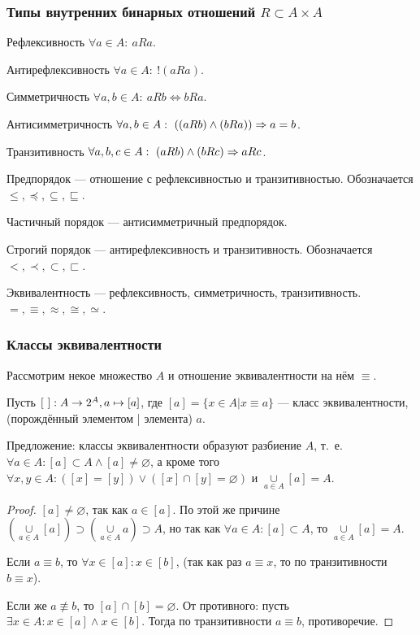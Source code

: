 \documentclass[a4paper]{report}
\begin{document}
    \subsubsection{Типы внутренних бинарных отношений $R \subset A \times A$}

    Рефлексивность $\forall a \in A:~a R a$.

    Антирефлексивность $\forall a \in A:~!(a R a)$.

    Симметричность $\forall a, b \in A:~a R b \iff b R a$.

    Антисимметричность $\forall a, b \in A:~((a R b) \land (b R a)) \Rightarrow a = b$.

    Транзитивность $\forall a, b, c \in A:~(a R b) \land (b R c) \Rightarrow a R c$.

    Предпорядок --- отношение с рефлексивностью и транзитивностью.
    Обозначается $\le, \preceq, \subseteq, \sqsubseteq$.

    Частичный порядок --- антисимметричный предпорядок.

    Строгий порядок --- антирефлексивность и транзитивность.
    Обозначается $<, \prec, \subset, \sqsubset$.

    Эквивалентность --- рефлексивность, симметричность, транзитивность. $=, \equiv, \approx, \cong, \simeq$.

    \subsubsection{Классы эквивалентности}

    Рассмотрим некое множество $A$ и отношение эквивалентности на нём $\equiv$.

    Пусть $[~]: A \rightarrow 2^A, a \mapsto [a]$, где $[a] = \{x \in A | x \equiv a\}$ --- класс эквивалентности, (порождённый элементом | элемента) $a$.

    Предложение: классы эквивалентности образуют разбиение $A$, т.\ е.\ $\forall a \in A: [a] \subset A \land [a] \ne \varnothing$, а кроме того $\forall x, y \in A: ([x] = [y]) \lor ([x] \cap [y] = \varnothing)$ и $\underset{a \in A}{\cup}[a] = A$.

    \begin{proof}
        $[a] \ne \varnothing$, так как $a \in [a]$.
        По этой же причине $\left(\underset{a \in A}{\cup}[a]\right) \supset \left(\underset{a \in A}{\cup}a\right) \supset A$, но так как $\forall a \in A: [a] \subset A$, то  $\underset{a \in A}{\cup}[a] = A$.

        Если $a \equiv b$, то $\forall x \in [a] : x \in [b]$, (так как раз $a \equiv x$, то по транзитивности $b \equiv x$).

        Если же $a \not\equiv b$, то $[a] \cap [b] = \varnothing$.
        От противного: пусть $\exists x \in A: x \in [a] \land x \in [b]$.
        Тогда по транзитивности $a \equiv b$, противоречие.
    \end{proof}
\end{document}

